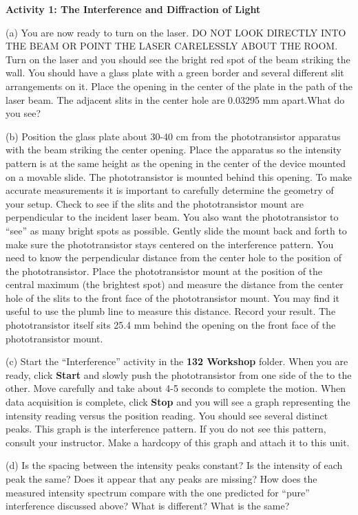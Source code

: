 \textbf{Activity 1: The Interference and Diffraction of Light }

(a) You are now ready to turn on the laser. DO NOT LOOK DIRECTLY INTO
THE BEAM OR POINT THE LASER CARELESSLY ABOUT THE ROOM. Turn on the
laser and you should see the bright red spot of the beam striking
the wall. You should have a glass plate with a green border and several
different slit arrangements on it. Place the opening in the center
of the plate in the path of the laser beam. The adjacent slits in
the center hole are 0.03295 mm apart.What do you see? 
\vspace{20mm}

(b) Position the glass plate about 30-40 cm from the phototransistor
apparatus with the beam striking the center opening. Place the apparatus
so the intensity pattern is at the same height as the opening in the
center of the device mounted on a movable slide. The phototransistor
is mounted behind this opening. To make accurate measurements it is important
to carefully determine the geometry of your setup. Check to see if
the slits and the phototransistor mount are perpendicular to the incident
laser beam. You also want the phototransistor to {}``see'' as many
bright spots as possible. Gently slide the mount back and forth to
make sure the phototransistor stays centered on the interference pattern.
You need to know the perpendicular distance from the center hole to
the position of the phototransistor. Place the phototransistor mount
at the position of the central maximum (the brightest spot) and measure
the distance from the center hole of the slits to the front face of
the phototransistor mount. You may find it useful to use the plumb
line to measure this distance. Record your result. The phototransistor
itself sits 25.4 mm behind the opening on the front face of the phototransistor
mount.
\vspace{20mm}

(c) Start the ``Interference'' activity in the {\bf 132 Workshop} folder. 
When you are ready, click {\bf Start} and slowly push the phototransistor from one side of the 
to the other. Move carefully and take about 4-5 seconds to complete
the motion. When data acquisition is complete, click {\bf Stop} and you will see a graph
representing the intensity reading versus the position reading. You
should see several distinct peaks. This graph is the interference
pattern. If you do not see this pattern, consult your instructor.
Make a hardcopy of this graph and attach it to this unit.

(d) Is the spacing between the intensity peaks constant? Is the intensity
of each peak the same? Does it appear that any peaks are missing?
How does the measured intensity spectrum compare with the one predicted
for {}``pure'' interference discussed above? What is different?
What is the same?
\vspace{30mm}

